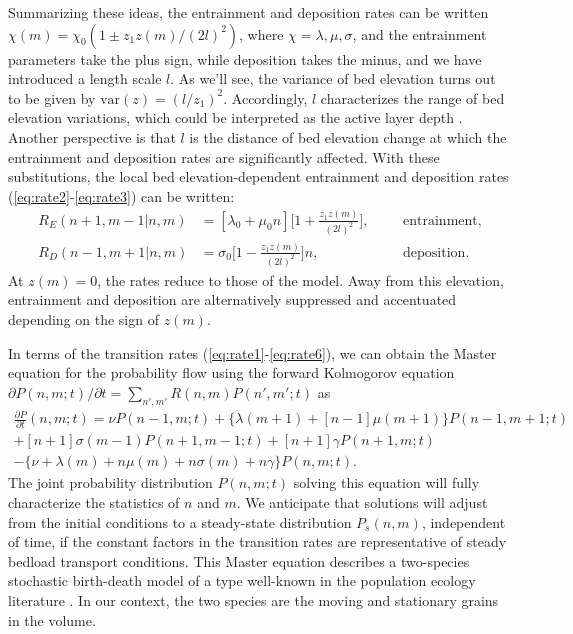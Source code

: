 \documentclass[draft]{agujournal2018}
\begin{document}
Summarizing these ideas, the entrainment and deposition rates can be written $\chi(m) = \chi_0(1\pm z_1 z(m)/(2l)^2)$, where $\chi = \lambda, \mu, \sigma$, and the entrainment parameters take the plus sign, while deposition takes the minus, and we have introduced a length scale $l$.
As we'll see, the variance of bed elevation turns out to be given by $\text{var}(z) = (l / z_1)^2$. Accordingly, $l$ characterizes the range of bed elevation variations, which could be interpreted as the active layer depth \citep[e.g.][]{Church2017}.
Another perspective is that $l$ is the distance of bed elevation change at which the entrainment and deposition rates are significantly affected.
With these substitutions, the local bed elevation-dependent entrainment and deposition rates (\ref{eq:rate2}-\ref{eq:rate3}) can be written:
\begin{align}
R_E(n+1,m-1|n,m)&=[\lambda_0 + \mu_0 n]\Big[1 + \frac{z_1z(m)}{(2l)^2}\Big], && &\text{entrainment}, \label{eq:rate5}\\
R_D(n-1,m+1|n,m)&=\sigma_0 \Big[1-\frac{z_1z(m)}{(2l)^2}\Big]n, && &\text{deposition}. \label{eq:rate6}
\end{align}
At $z(m)=0$, the rates reduce to those of the \citet{Ancey2008} model.
Away from this elevation, entrainment and deposition are alternatively suppressed and accentuated depending on the sign of $z(m)$.


In terms of the transition rates (\ref{eq:rate1}-\ref{eq:rate6}), we can obtain the Master equation for the probability flow using the forward Kolmogorov equation $\partial P(n,m;t)/\partial t = 
\sum_{n',m'} R(n,m)P(n',m';t)$ \citep[e.g.][]{Cox1965, Gillespie1992, Ancey2008} as 
\begin{multline}
 \frac{\partial P}{\partial t}(n,m;t) =  
\nu P(n-1,m;t) + 
\{\lambda(m+1) + [n-1]\mu(m+1)\}P(n-1,m+1;t)\\ + 
[n+1]\sigma(m-1)P(n+1,m-1;t) + 
[n+1]\gamma P(n+1,m;t) \\- 
\{ \nu + \lambda(m) + n\mu(m) + n\sigma(m) + n \gamma \}P(n,m;t).
 \label{eq:master}
\end{multline}
The joint probability distribution $P(n,m;t)$ solving this equation will fully characterize the statistics of $n$ and $m$.
We anticipate that solutions will adjust from the initial conditions to a steady-state distribution $P_s(n,m)$, independent of time, if the constant factors in the transition rates are representative of steady bedload transport conditions.
This Master equation describes a two-species stochastic birth-death model \citep[e.g.][]{Cox1965} of a type well-known in the population ecology literature \citep[e.g.][]{Pielou1977, Swift2002}.
In our context, the two species are the moving and stationary grains in the volume.
\end{document}
